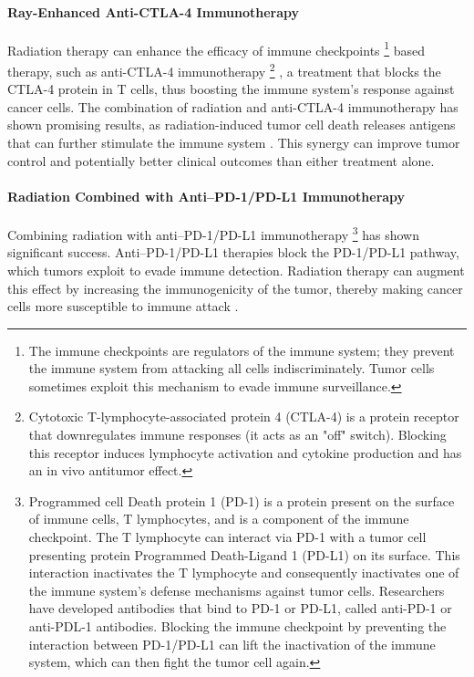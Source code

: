 \paragraph{Ray-Enhanced Anti-CTLA-4 Immunotherapy}
Radiation therapy can enhance the efficacy of immune checkpoints
\footnote{
	The immune checkpoints are regulators of the immune system; they prevent the immune system from attacking all cells indiscriminately.
	Tumor cells sometimes exploit this mechanism to evade immune surveillance.
}
based therapy, such as anti-CTLA-4 immunotherapy
\footnote{
	Cytotoxic T-lymphocyte-associated protein 4 (CTLA-4) is a protein receptor that downregulates immune responses (it acts as an "off" switch).
	Blocking this receptor induces lymphocyte activation and cytokine production and has an in vivo antitumor effect.
}
, a treatment that blocks the CTLA-4 protein in T cells, thus boosting the immune system's response against cancer cells.
The combination of radiation and anti-CTLA-4 immunotherapy has shown promising results, as radiation-induced tumor cell death releases antigens that can further stimulate the immune system \cite{Vanpouillebox2015}.
This synergy can improve tumor control and potentially better clinical outcomes than either treatment alone.

\paragraph{Radiation Combined with Anti–PD-1/PD-L1 Immunotherapy}
Combining radiation with anti–PD-1/PD-L1 immunotherapy
\footnote{
	Programmed cell Death protein 1 (PD-1) is a protein present on the surface of immune cells, T lymphocytes, and is a component of the immune checkpoint.
	The T lymphocyte can interact via PD-1 with a tumor cell presenting protein Programmed Death-Ligand 1 (PD-L1) on its surface.
	This interaction inactivates the T lymphocyte and consequently inactivates one of the immune system's defense mechanisms against tumor cells.
	Researchers have developed antibodies that bind to PD-1 or PD-L1, called anti-PD-1 or anti-PDL-1 antibodies.
	Blocking the immune checkpoint by preventing the interaction between PD-1/PD-L1 can lift the inactivation of the immune system, which can then fight the tumor cell again.	
}
has shown significant success.
Anti–PD-1/PD-L1 therapies block the PD-1/PD-L1 pathway, which tumors exploit to evade immune detection.
Radiation therapy can augment this effect by increasing the immunogenicity of the tumor, thereby making cancer cells more susceptible to immune attack \cite{He2021}.


